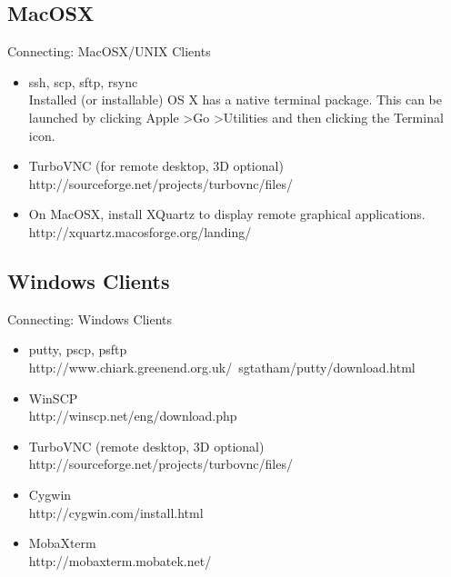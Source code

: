 \subsection{MacOSX}
\begin{frame}{Connecting: MacOSX/UNIX Clients}
\begin{itemize}
\item {\color<2->{red}ssh}, scp, sftp, {rsync}\hfill\\
\alert{\small Installed (or installable) OS X has a native terminal package. This can be launched by clicking Apple \textgreater Go \textgreater Utilities and then clicking the Terminal icon.}
\item<3-> TurboVNC \alert{\small (for remote desktop, 3D optional)}\hfill\\
\alert{\small http://sourceforge.net/projects/turbovnc/files/}
\item<4-> On MacOSX, install \alert{XQuartz} to display remote graphical applications.\hfill\\
\alert{\small http://xquartz.macosforge.org/landing/}
\end{itemize}
\end{frame}

\subsection{Windows Clients}
\begin{frame}{Connecting: Windows Clients}
\begin{itemize}
\item<1-5> putty, pscp, psftp\hfill\\
\alert{\small http://www.chiark.greenend.org.uk/~sgtatham/putty/download.html}
\item<2-5> WinSCP\hfill\\
\alert{\small http://winscp.net/eng/download.php}
\item<3-5> TurboVNC \alert{\small (remote desktop, 3D optional)}\hfill\\
\alert{\small http://sourceforge.net/projects/turbovnc/files/}
\item<4-5> Cygwin \hfill\\
\alert{\small http://cygwin.com/install.html}\hfill\\
\item<6> MobaXterm\hfill\\
\alert{\small http://mobaxterm.mobatek.net/}
\end{itemize}
\end{frame}

